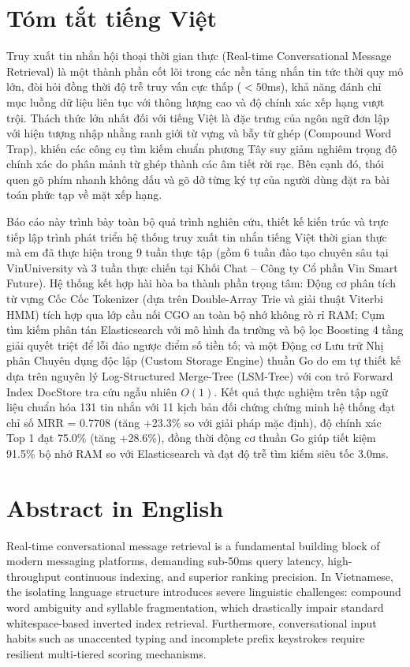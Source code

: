 \documentclass[12pt,a4paper,oneside]{report}
\begin{document}
\section*{Tóm tắt tiếng Việt}
Truy xuất tin nhắn hội thoại thời gian thực (Real-time Conversational Message Retrieval) là một thành phần cốt lõi trong các nền tảng nhắn tin tức thời quy mô lớn, đòi hỏi đồng thời độ trễ truy vấn cực thấp ($< 50$ms), khả năng đánh chỉ mục luồng dữ liệu liên tục với thông lượng cao và độ chính xác xếp hạng vượt trội. Thách thức lớn nhất đối với tiếng Việt là đặc trưng của ngôn ngữ đơn lập với hiện tượng nhập nhằng ranh giới từ vựng và bẫy từ ghép (Compound Word Trap), khiến các công cụ tìm kiếm chuẩn phương Tây suy giảm nghiêm trọng độ chính xác do phân mảnh từ ghép thành các âm tiết rời rạc. Bên cạnh đó, thói quen gõ phím nhanh không dấu và gõ dở từng ký tự của người dùng đặt ra bài toán phức tạp về mặt xếp hạng.

Báo cáo này trình bày toàn bộ quá trình nghiên cứu, thiết kế kiến trúc và trực tiếp lập trình phát triển hệ thống truy xuất tin nhắn tiếng Việt thời gian thực mà em đã thực hiện trong 9 tuần thực tập (gồm 6 tuần đào tạo chuyên sâu tại VinUniversity và 3 tuần thực chiến tại Khối Chat -- Công ty Cổ phần Vin Smart Future). Hệ thống kết hợp hài hòa ba thành phần trọng tâm: Động cơ phân tích từ vựng Cốc Cốc Tokenizer (dựa trên Double-Array Trie và giải thuật Viterbi HMM) tích hợp qua lớp cầu nối CGO an toàn bộ nhớ không rò rỉ RAM; Cụm tìm kiếm phân tán Elasticsearch với mô hình đa trường và bộ lọc Boosting 4 tầng giải quyết triệt để lỗi đảo ngược điểm số tiền tố; và một Động cơ Lưu trữ Nhị phân Chuyên dụng độc lập (Custom Storage Engine) thuần Go do em tự thiết kế dựa trên nguyên lý Log-Structured Merge-Tree (LSM-Tree) với con trỏ Forward Index DocStore tra cứu ngẫu nhiên $O(1)$. Kết quả thực nghiệm trên tập ngữ liệu chuẩn hóa 131 tin nhắn với 11 kịch bản đối chứng chứng minh hệ thống đạt chỉ số MRR = 0.7708 (tăng +23.3\% so với giải pháp mặc định), độ chính xác Top 1 đạt 75.0\% (tăng +28.6\%), đồng thời động cơ thuần Go giúp tiết kiệm 91.5\% bộ nhớ RAM so với Elasticsearch và đạt độ trễ tìm kiếm siêu tốc 3.0ms.

\section*{Abstract in English}
Real-time conversational message retrieval is a fundamental building block of modern messaging platforms, demanding sub-50ms query latency, high-throughput continuous indexing, and superior ranking precision. In Vietnamese, the isolating language structure introduces severe linguistic challenges: compound word ambiguity and syllable fragmentation, which drastically impair standard whitespace-based inverted index retrieval. Furthermore, conversational input habits such as unaccented typing and incomplete prefix keystrokes require resilient multi-tiered scoring mechanisms.
\end{document}

